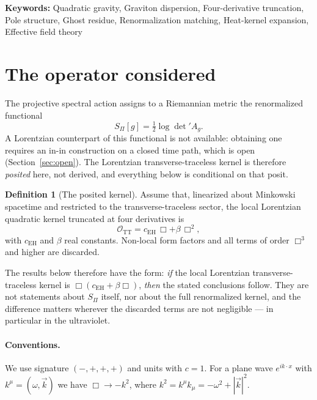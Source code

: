 \documentclass[12pt,a4paper]{article}
\theoremstyle{definition}
\newtheorem{definition}[theorem]{Definition}
\newcommand{\Spi}{S_{\Pi}}
\newcommand{\Ag}{A_g}
\newcommand{\cEH}{c_{\mathrm{EH}}}
\newcommand{\OTT}{\mathcal{O}_{\mathrm{TT}}}
\begin{document}
  \noindent\textbf{Keywords:} Quadratic gravity, Graviton dispersion, Four-derivative truncation, Pole structure,
  Ghost residue, Renormalization matching, Heat-kernel expansion, Effective field theory

  \clearpage
  \tableofcontents
  \newpage

  \section{The operator considered}
    \label{sec:setup}

    The projective spectral action assigns to a Riemannian metric the renormalized functional
    \[
      \Spi[g] = \tfrac12\log\det{}'\Ag .
    \]
    A Lorentzian counterpart of this functional is not available: obtaining one requires an in-in construction on
    a closed time path, which is open (Section~\ref{sec:open}). The Lorentzian transverse-traceless kernel is
    therefore \emph{posited} here, not derived, and everything below is conditional on that posit.

    \begin{definition}[The posited kernel]
      \label{def:truncation}
      Assume that, linearized about Minkowski spacetime and restricted to the transverse-traceless sector, the
      local Lorentzian quadratic kernel truncated at four derivatives is
      \begin{equation}
        \OTT = \cEH\,\Box + \beta\,\Box^2 ,
        \label{eq:trunc}
      \end{equation}
      with $\cEH$ and $\beta$ real constants. Non-local form factors and all terms of order $\Box^3$ and higher
      are discarded.
    \end{definition}

    The results below therefore have the form: \emph{if} the local Lorentzian transverse-traceless kernel is
    $\Box(\cEH + \beta\Box)$, \emph{then} the stated conclusions follow. They are not statements about
    $\Spi$ itself, nor about the full renormalized kernel, and the difference matters wherever the discarded
    terms are not negligible --- in particular in the ultraviolet.

    \paragraph{Conventions.}
      We use signature $(-,+,+,+)$ and units with $c = 1$. For a plane wave $e^{ik\cdot x}$ with
      $k^\mu = (\omega, \vec k)$ we have $\Box \to -k^2$, where $k^2 = k^\mu k_\mu = -\omega^2 + |\vec k|^2$.
\end{document}
